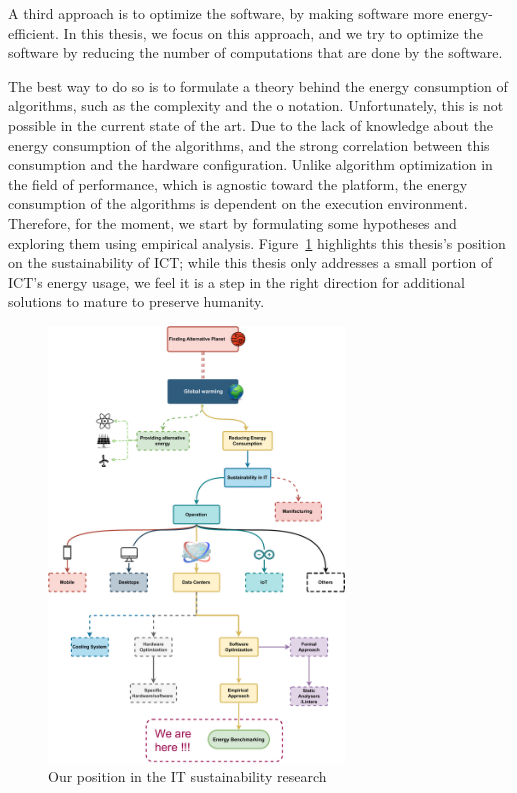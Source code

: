 A third approach is to optimize the software, by making software more energy-efficient.
In this thesis, we focus on this approach, and we try to optimize the software by reducing the number of computations that are done by the software.

The best way to do so is to formulate a theory behind the energy consumption of algorithms, such as the complexity and the o notation.
Unfortunately, this is not possible in the current state of the art.
Due to the lack of knowledge about the energy consumption of the algorithms, and the strong correlation between this consumption and the hardware configuration.
Unlike algorithm optimization in the field of performance, which is agnostic toward the platform, the energy consumption of the algorithms is dependent on the execution environment.
Therefore, for the moment, we start by formulating some hypotheses and exploring them using empirical analysis.
Figure~\ref{fig:thesis_position} highlights this thesis's position on the sustainability of ICT\@; while this thesis only addresses a small portion of ICT's energy usage, we feel it is a step in the right direction for additional solutions to mature to preserve humanity.

\begin{figure}[!h]
    \centering
    \includegraphics[width=0.7\textwidth,height=\textheight,keepaspectratio]{chapters/thesis_position.pdf}
    \caption{Our position in the IT sustainability research}
    \label{fig:thesis_position}
\end{figure}
